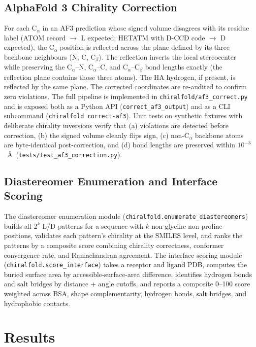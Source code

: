 \documentclass[11pt]{article}
\begin{document}
\subsection{AlphaFold 3 Chirality Correction}

For each C$_\alpha$ in an AF3 prediction whose signed volume disagrees with its residue label (ATOM record $\to$ L expected; HETATM with D-CCD code $\to$ D expected), the C$_\alpha$ position is reflected across the plane defined by its three backbone neighbours (N, C, C$_\beta$). The reflection inverts the local stereocenter while preserving the C$_\alpha$--N, C$_\alpha$--C, and C$_\alpha$--C$_\beta$ bond lengths exactly (the reflection plane contains those three atoms). The HA hydrogen, if present, is reflected by the same plane. The corrected coordinates are re-audited to confirm zero violations. The full pipeline is implemented in \texttt{chiralfold/af3\_correct.py} and is exposed both as a Python API (\texttt{correct\_af3\_output}) and as a CLI subcommand (\texttt{chiralfold correct-af3}). Unit tests on synthetic fixtures with deliberate chirality inversions verify that (a) violations are detected before correction, (b) the signed volume cleanly flips sign, (c) non-C$_\alpha$ backbone atoms are byte-identical post-correction, and (d) bond lengths are preserved within $10^{-3}$~\AA\ (\texttt{tests/test\_af3\_correction.py}).

\subsection{Diastereomer Enumeration and Interface Scoring}

The diastereomer enumeration module (\texttt{chiralfold.enumerate\_diastereomers}) builds all $2^k$ L/D patterns for a sequence with $k$ non-glycine non-proline positions, validates each pattern's chirality at the SMILES level, and ranks the patterns by a composite score combining chirality correctness, conformer convergence rate, and Ramachandran agreement. The interface scoring module (\texttt{chiralfold.score\_interface}) takes a receptor and ligand PDB, computes the buried surface area by accessible-surface-area difference, identifies hydrogen bonds and salt bridges by distance + angle cutoffs, and reports a composite 0--100 score weighted across BSA, shape complementarity, hydrogen bonds, salt bridges, and hydrophobic contacts.

\section{Results}
\end{document}
